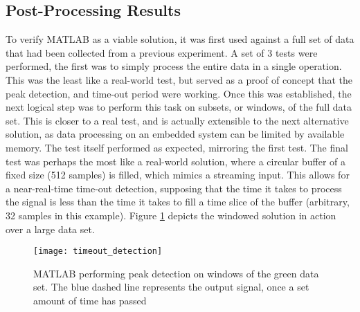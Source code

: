 \label{sec::simulation}
\subsection{Post-Processing Results}
	To verify MATLAB as a viable solution, it was first used against a full set of data that had been collected from a previous experiment. A set of 3 tests were performed, the first was to simply process the entire data in a single operation. This was the least like a real-world test, but served as a proof of concept that the peak detection, and time-out period were working. Once this was established, the next logical step was to perform this task on subsets, or windows, of the full data set. This is closer to a real test, and is actually extensible to the next alternative solution, as data processing on an embedded system can be limited by available memory. The test itself performed as expected, mirroring the first test. The final test was perhaps the most like a real-world solution, where a circular buffer of a fixed size (512 samples) is filled, which mimics a streaming input. This allows for a near-real-time time-out detection, supposing that the time it takes to process the signal is less than the time it takes to fill a time slice of the buffer (arbitrary, 32 samples in this example). Figure \ref{fig::timeout_detection} depicts the windowed solution in action over a large data set.
	
	\begin{figure}[htbp!]
		\centering
		\texttt{[image: timeout\_detection]}
		\caption[MATLAB windowed peak detection on generated data]{MATLAB performing peak detection on windows of the green data set. The blue dashed line represents the output signal, once a set amount of time has passed}
		\label{fig::timeout_detection}
	\end{figure}
